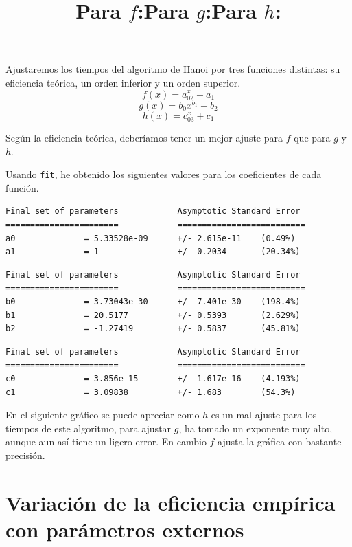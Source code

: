 \documentclass[a4]{article}
\begin{document}
\begin{flushleft} 
  Ajustaremos los tiempos del algoritmo de Hanoi por tres funciones
  distintas: su eficiencia teórica, un orden inferior y un orden
  superior.
\[f(x)=a_02^x+a_1\]
\[g(x)=b_0x^{b_1}+b_2\]
\[h(x)=c_03^x+c_1\]

Según la eficiencia teórica, deberíamos tener un mejor ajuste para $f$
que para $g$ y $h$.
\end{flushleft}

\begin{flushleft}
  Usando \texttt{fit}, he obtenido los siguientes valores para los
  coeficientes de cada función.
\end{flushleft}

\title{Para $f$:}
\begin{verbatim}
Final set of parameters            Asymptotic Standard Error
=======================            ==========================
a0              = 5.33528e-09      +/- 2.615e-11    (0.49%)
a1              = 1                +/- 0.2034       (20.34%)
\end{verbatim}

\title{Para $g$:}
\begin{verbatim}
Final set of parameters            Asymptotic Standard Error
=======================            ==========================
b0              = 3.73043e-30      +/- 7.401e-30    (198.4%)
b1              = 20.5177          +/- 0.5393       (2.629%)
b2              = -1.27419         +/- 0.5837       (45.81%)
\end{verbatim}

\title{Para $h$:}
\begin{verbatim}
Final set of parameters            Asymptotic Standard Error
=======================            ==========================
c0              = 3.856e-15        +/- 1.617e-16    (4.193%)
c1              = 3.09838          +/- 1.683        (54.3%)
\end{verbatim}

\begin{flushleft}
  En el siguiente gráfico se puede apreciar como $h$ es un mal ajuste
  para los tiempos de este algoritmo, para ajustar $g$, ha tomado un
  exponente muy alto, aunque aun así tiene un ligero error. En cambio
  $f$ ajusta la gráfica con bastante precisión.
\end{flushleft}

\begin{figure}[H] \centering
\end{figure}

\section{Variación de la eficiencia empírica con parámetros externos}
\end{document}
